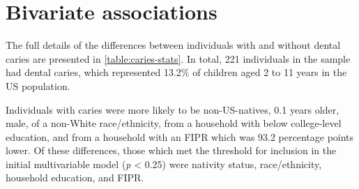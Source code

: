 \section{Bivariate associations}

The full details of the differences between individuals with and without dental caries are presented in \autoref{table:caries-stats}. In total, 221 individuals in the sample had dental caries, which represented 13.2\% of children aged 2 to 11 years in the US population. 

Individuals with caries were more likely to be non-US-natives, 0.1 years older, male, of a non-White race/ethnicity, from a household with below college-level education, and from a household with an FIPR which was 93.2 percentage points lower. Of these differences, those which met the threshold for inclusion in the initial multivariable model (\emph{p} < 0.25) were nativity status, race/ethnicity, household education, and FIPR.

